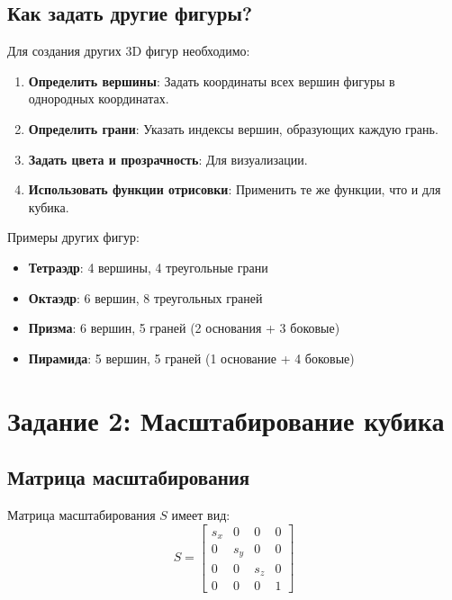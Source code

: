 \subsection*{Как задать другие фигуры?}

Для создания других 3D фигур необходимо:

\begin{enumerate}
\item \textbf{Определить вершины}: Задать координаты всех вершин фигуры в однородных координатах.

\item \textbf{Определить грани}: Указать индексы вершин, образующих каждую грань.

\item \textbf{Задать цвета и прозрачность}: Для визуализации.

\item \textbf{Использовать функции отрисовки}: Применить те же функции, что и для кубика.
\end{enumerate}

Примеры других фигур:
\begin{itemize}
\item \textbf{Тетраэдр}: 4 вершины, 4 треугольные грани
\item \textbf{Октаэдр}: 6 вершин, 8 треугольных граней  
\item \textbf{Призма}: 6 вершин, 5 граней (2 основания + 3 боковые)
\item \textbf{Пирамида}: 5 вершин, 5 граней (1 основание + 4 боковые)
\end{itemize}

\section*{Задание 2: Масштабирование кубика}

\subsection*{Матрица масштабирования}

Матрица масштабирования $S$ имеет вид:
\begin{equation}
S = \begin{bmatrix}
s_x & 0 & 0 & 0 \\
0 & s_y & 0 & 0 \\
0 & 0 & s_z & 0 \\
0 & 0 & 0 & 1
\end{bmatrix}
\end{equation}

